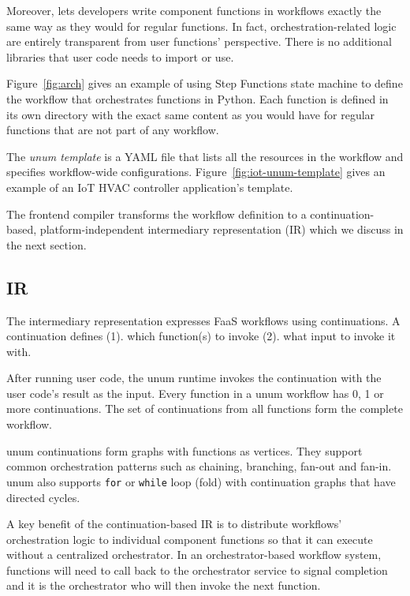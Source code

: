 Moreover, \name{} lets developers write component functions in
workflows exactly the same way as they would for regular functions. In fact,
orchestration-related logic are entirely transparent from user functions'
perspective. There is no additional libraries that user code needs to import
or use.

Figure~\ref{fig:arch} gives an example of using Step Functions state machine
to define the workflow that orchestrates functions in Python. Each
function is defined in its own directory with the exact same content as you
would have for regular functions that are not part of any workflow.

The \emph{unum template} is a YAML file that lists all the resources in the
workflow and specifies workflow-wide configurations.
Figure~\ref{fig:iot-unum-template} gives an example of an IoT HVAC controller
application's template.

The frontend compiler transforms the workflow definition to a
continuation-based, platform-independent intermediary representation (IR)
which we discuss in the next section.



\subsection{\name{} IR}\label{sec:design-ir}

The \name{} intermediary representation expresses FaaS workflows using
continuations. A continuation defines (1). which function(s) to invoke (2).
what input to invoke it with.

After running user code, the unum runtime invokes the continuation with the
user code's result as the input. Every function in a unum workflow has 0, 1 or
more continuations. The set of continuations from all functions form the
complete workflow.

unum continuations form graphs with functions as vertices. They support common
orchestration patterns such as chaining, branching, fan-out and fan-in. unum
also supports \texttt{for} or \texttt{while} loop (fold) with continuation
graphs that have directed cycles.

A key benefit of the continuation-based IR is to distribute workflows'
orchestration logic to individual component functions so that it can execute
without a centralized orchestrator. In an orchestrator-based workflow system,
functions will need to call back to the orchestrator service to signal
completion and it is the orchestrator who will then invoke the next function.

